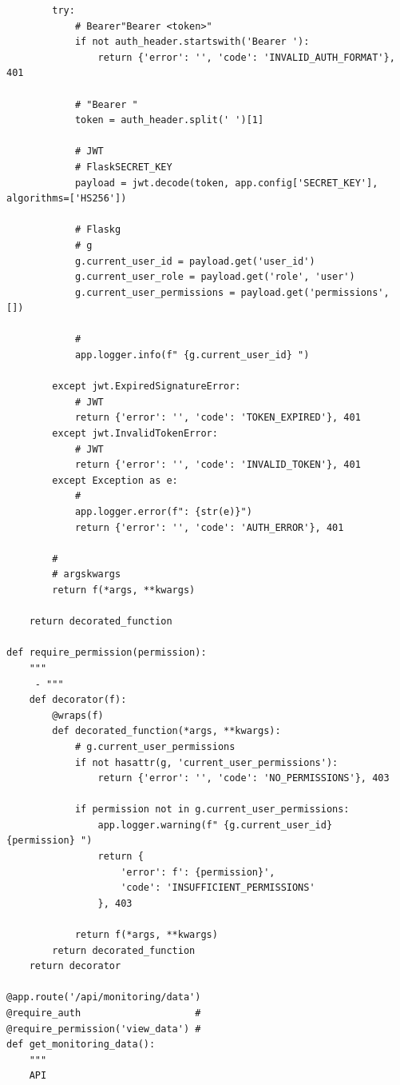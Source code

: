 \begin{verbatim}
        try:
            # Bearer"Bearer <token>"
            if not auth_header.startswith('Bearer '):
                return {'error': '', 'code': 'INVALID_AUTH_FORMAT'}, 401
            
            # "Bearer "
            token = auth_header.split(' ')[1]
            
            # JWT
            # FlaskSECRET_KEY
            payload = jwt.decode(token, app.config['SECRET_KEY'], algorithms=['HS256'])
            
            # Flaskg
            # g
            g.current_user_id = payload.get('user_id')
            g.current_user_role = payload.get('role', 'user')
            g.current_user_permissions = payload.get('permissions', [])
            
            # 
            app.logger.info(f" {g.current_user_id} ")
            
        except jwt.ExpiredSignatureError:
            # JWT
            return {'error': '', 'code': 'TOKEN_EXPIRED'}, 401
        except jwt.InvalidTokenError:
            # JWT
            return {'error': '', 'code': 'INVALID_TOKEN'}, 401
        except Exception as e:
            # 
            app.logger.error(f": {str(e)}")
            return {'error': '', 'code': 'AUTH_ERROR'}, 401
        
        # 
        # argskwargs
        return f(*args, **kwargs)
    
    return decorated_function

def require_permission(permission):
    """
     - """
    def decorator(f):
        @wraps(f)
        def decorated_function(*args, **kwargs):
            # g.current_user_permissions
            if not hasattr(g, 'current_user_permissions'):
                return {'error': '', 'code': 'NO_PERMISSIONS'}, 403
            
            if permission not in g.current_user_permissions:
                app.logger.warning(f" {g.current_user_id}  {permission} ")
                return {
                    'error': f': {permission}', 
                    'code': 'INSUFFICIENT_PERMISSIONS'
                }, 403
            
            return f(*args, **kwargs)
        return decorated_function
    return decorator

@app.route('/api/monitoring/data')
@require_auth                    # 
@require_permission('view_data') # 
def get_monitoring_data():
    """
    API
    

\end{verbatim}
